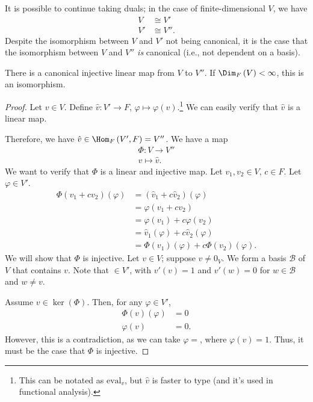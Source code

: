 \documentclass[10pt]{mypackage}
\begin{document}
\begin{remark}
  It is possible to continue taking duals; in the case of finite-dimensional $V$, we have
  \begin{align*}
    V &\cong V'\\
    V' &\cong V''.
  \end{align*}
  Despite the isomorphism between $V$ and $V'$ not being canonical, it is the case that the isomorphism between $V$ and $V''$ \textit{is} canonical (i.e., not dependent on a basis).
\end{remark}
\begin{proposition}
  There is a canonical injective linear map from $V$ to $V''$. If $\Dim_{F}\left(V\right) < \infty$, this is an isomorphism.
\end{proposition}
\begin{proof}
  Let $v\in V$. Define $\hat{v}: V' \rightarrow F$, $\varphi \mapsto \varphi(v)$.\footnote{This can be notated as $\text{eval}_v$, but $\hat{v}$ is faster to type (and it's used in functional analysis).} We can easily verify that $\hat{v}$ is a linear map.\newline

  Therefore, we have $\hat{v}\in \Hom_{F}\left(V',F\right) = V''$. We have a map
  \begin{align*}
    \Phi: V\rightarrow V''\\
    v\mapsto \hat{v}.
  \end{align*}
  We want to verify that $\Phi$ is a linear and injective map. Let $v_1,v_2\in V$, $c\in F$. Let $\varphi\in V'$.
  \begin{align*}
    \Phi\left(v_1 + cv_2\right)\left(\varphi\right) &= \left(\hat{v}_1 + c\hat{v}_2\right)\left(\varphi\right)\\
                                                    &= \varphi\left(v_1 + cv_2\right)\\
                                                    &= \varphi\left(v_1\right) + c\varphi\left(v_2\right)\\
                                                    &= \hat{v}_1\left(\varphi\right) + c\hat{v}_2\left(\varphi\right)\\
                                                    &= \Phi\left(v_1\right)(\varphi) + c\Phi\left(v_2\right)\left(\varphi\right).
  \end{align*}
  We will show that $\Phi$ is injective. Let $v\in V$; suppose $v\neq 0_V$. We form a basis $\mathcal{B}$ of $V$ that contains $v$. Note that $\in V'$, with $v'(v) = 1$ and $v'(w) = 0$ for $w\in \mathcal{B}$ and $w\neq v$.\newline
  
  Assume $v\in \ker\left(\Phi\right)$. Then, for any $\varphi\in V'$,
  \begin{align*}
    \Phi\left(v\right)(\varphi) &= 0\\
    \varphi(v) &= 0.
  \end{align*}
  However, this is a contradiction, as we can take $\varphi = $, where $\varphi(v) = 1$. Thus, it must be the case that $\Phi$ is injective.
\end{proof}
\end{document}
